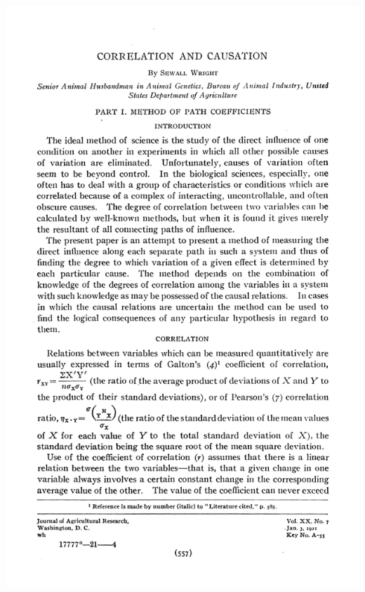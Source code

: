 \documentclass{beamer}
\begin{document}
\begin{frame}

\centering
\includegraphics[height = \textheight]{figs/wright1921_p1}

\end{frame}
\end{document}
